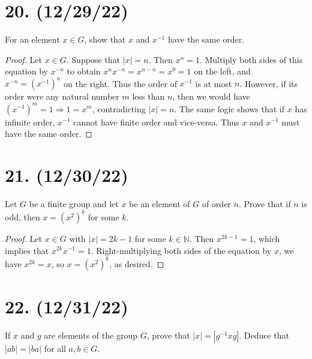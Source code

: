 \documentclass{article}
\begin{document}
\section*{20. (12/29/22)}

For an element $x \in G$, show that $x$ and $x^{-1}$ have the same order.

\begin{proof}
      Let $x \in G$. Suppose that $|x| = n$. Then $x^n = 1$. Multiply both sides of this equation by $x^{-n}$ to obtain $x^n x^{-n} = x^{n - n} = x^0 = 1$ on the left, and $x^{-n} = (x^{-1})^n$ on the right. Thus the order of $x^{-1}$ is at most $n$. However, if its order were any natural number $m$ less than $n$, then we would have\newline
      $(x^{-1})^m = 1 \Rightarrow 1 = x^m$, contradicting $|x| = n$. The same logic shows that if $x$ has infinite order, $x^{-1}$ cannot have finite order and vice-versa. Thus $x$ and $x^{-1}$ must have the same order.
\end{proof}

\section*{21. (12/30/22)}

Let $G$ be a finite group and let $x$ be an element of $G$ of order $n$. Prove that if $n$ is odd, then $x = (x^2)^k$ for some $k$.

\begin{proof}
      Let $x \in G$ with $|x| = 2k - 1$ for some $k \in \mathbb{N}$. Then $x^{2k - 1} = 1$, which implies that $x^{2k} x^{-1} = 1$. Right-multiplying both sides of the equation by $x$, we have $x^{2k} = x$, so $x = (x^2)^k$, as desired.
\end{proof}

\section*{22. (12/31/22)}

If $x$ and $g$ are elements of the group $G$, prove that $|x| = |g^{-1}xg|$. Deduce that $|ab| = |ba|$ for all $a, b \in G$.
\end{document}
